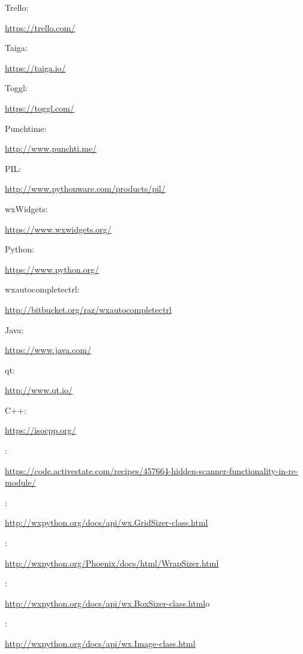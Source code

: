 \documentclass[12pt,a4paper,naustrian,english,oneside,openright,DIV=12,BCOR=1cm]{scrbook}
\begin{document}

\begin{thebibliography}{999}
	
	 Trello: 
	 
	\url{https://trello.com/}
	
	 Taiga:  
	
	\url{https://taiga.io/}
	
	 Toggl: 
	 
	\url{https://toggl.com/}
	
	 Punchtime:  
	
	\url{http://www.punchti.me/}
	
	 PIL:  
	
	\url{http://www.pythonware.com/products/pil/}
	
	 wxWidgets:  
	
	\url{https://www.wxwidgets.org/}
	
	 Python:  
	
	\url{https://www.python.org/}
	
	 wxautocompletectrl: 
	 
	\url{http://bitbucket.org/raz/wxautocompletectrl}
	
	 Java:  
	
	\url{https://www.java.com/}
	
	 qt:  
	
	\url{http://www.qt.io/}
	
	 C++: 
	 
	\url{https://isocpp.org/}

	 :

	\url{https://code.activestate.com/recipes/457664-hidden-scanner-functionality-in-re-module/}

	 :

	\url{http://wxpython.org/docs/api/wx.GridSizer-class.html}

	 :

	\url{http://wxpython.org/Phoenix/docs/html/WrapSizer.html}

	 :

	\url{http://wxpython.org/docs/api/wx.BoxSizer-class.html}o

	 :

	\url{http://wxpython.org/docs/api/wx.Image-class.html}


\end{thebibliography}
\end{document}
